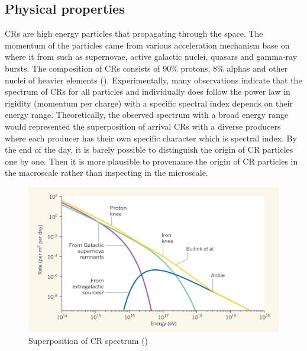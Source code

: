\subsection{Physical properties}
CRs are high energy particles that propagating through
the space. The momentum of the particles came from
various acceleration mechanism base on where it from 
such as supernovae, active galactic nuclei, quasars 
and gamma-ray bursts. The composition of CRs consists of
90\% protons, 8\% alphas and other nuclei of heavier
elements (\cite{CRComposition2017}). Experimentally,
many observations indicate that the spectrum of CRs 
for all particles and individually does follow the 
power law in rigidity (momentum per charge) with a specific spectral index depends on 
their energy range. Theoretically, the observed spectrum
with a broad energy range would represented the superposition
of arrival CRs with a diverse producers where each producer
has their own specific character which is spectral index.
By the end of the day, it is barely possible to distinguish
the origin of CR particles one by one. Then it is more 
plausible to provenance the origin of CR particles in the 
macroscale rather than inspecting in the microscale.




\begin{figure}[h!]
    \centering
    \includegraphics[width=\textwidth]{content/background/figures/andrew_superposition.png}
    \caption{Superposition of CR spectrum (\cite{taylor2016_crspectrumsuperposition})}
    \label{fig:cr_superposition}
\end{figure}

